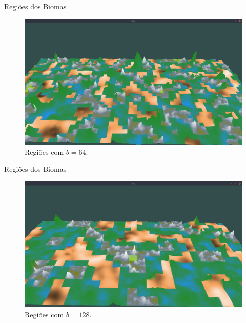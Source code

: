 \begin{frame}{Regiões dos Biomas}
    \begin{figure}[H]
        \centering
        \includegraphics[width=.9\textwidth]{img/re2bfb/b/64f4.png}
        \caption{Regiões com $b = 64$.}
        \label{fig:img_re2bfb_b_64f4}
    \end{figure}
    
    
\end{frame}

\begin{frame}{Regiões dos Biomas}
    \begin{figure}[H]
        \centering
        \includegraphics[width=.9\textwidth]{img/re2bfb/b/128f4.png}
        \caption{Regiões com $b = 128$.}
        \label{fig:img_re2bfb_b_128f4}
    \end{figure}
    
    
\end{frame}

